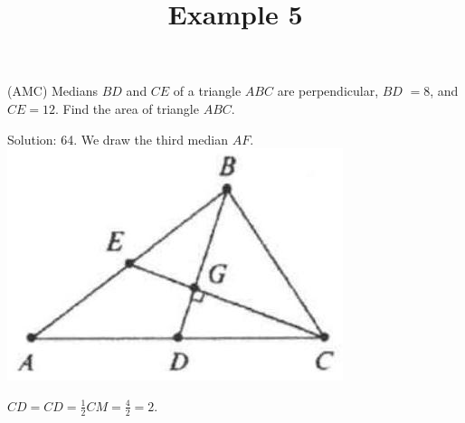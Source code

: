 \documentclass{article}
\title{Example 5}
\date{}
\begin{document}
\maketitle

(AMC) Medians \(B D\) and \(C E\) of a triangle \(A B C\) are perpendicular, \(B D\) \(=8\), and \(C E=12\). Find the area of triangle \(A B C\).

Solution: 64.
We draw the third median \(A F\).\\
\centering
\includegraphics[width=\textwidth]{images/010(3).jpg}


\(C D=C D=\frac{1}{2} C M=\frac{4}{2}=2\).
\end{document}
